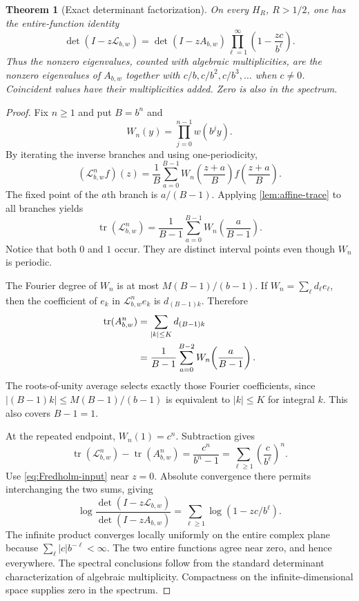 \documentclass[11pt,a4paper]{article}
\newtheorem{theorem}{Theorem}[section]
\theoremstyle{definition}
\theoremstyle{remark}
\newcommand{\Lop}{\mathcal L}
\newcommand{\tr}{\operatorname{tr}}
\numberwithin{equation}{section}
\begin{document}
\begin{theorem}[Exact determinant factorization]
\label{thm:general-det}
On every $H_R$, $R>1/2$, one has the entire-function identity
\begin{equation}
 \boxed{\displaystyle
 \det(I-z\Lop_{b,w})=
 \det(I-zA_{b,w})
 \prod_{\ell=1}^{\infty}\left(1-\frac{zc}{b^\ell}\right).}
 \label{eq:general-det}
\end{equation}
Thus the nonzero eigenvalues, counted with algebraic multiplicities, are the
nonzero eigenvalues of $A_{b,w}$ together with
$c/b,c/b^2,c/b^3,\ldots$ when $c\ne0$. Coincident values have their
multiplicities added. Zero is also in the spectrum.
\end{theorem}
\begin{proof}
Fix $n\ge1$ and put $B=b^n$ and
\begin{equation}
 W_n(y)=\prod_{j=0}^{n-1}w(b^jy).
 \label{eq:Wn}
\end{equation}
By iterating the inverse branches and using one-periodicity,
\begin{equation}
 (\Lop_{b,w}^nf)(z)=\frac1B\sum_{a=0}^{B-1}
       W_n\!\left(\frac{z+a}{B}\right)
       f\!\left(\frac{z+a}{B}\right).
 \label{eq:iterate}
\end{equation}
The fixed point of the $a$th branch is $a/(B-1)$. Applying
\cref{lem:affine-trace} to all branches yields
\begin{equation}
 \tr(\Lop_{b,w}^n)=\frac{1}{B-1}
    \sum_{a=0}^{B-1}W_n\!\left(\frac{a}{B-1}\right).
 \label{eq:fulltrace}
\end{equation}
Notice that both $0$ and $1$ occur. They are distinct interval points even
though $W_n$ is periodic.

The Fourier degree of $W_n$ is at most
$M(B-1)/(b-1)$. If $W_n=\sum_\ell d_\ell e_\ell$, then the coefficient of
$e_k$ in $\Lop_{b,w}^ne_k$ is $d_{(B-1)k}$. Therefore
\begin{align}
 \tr(A_{b,w}^n)
 &=\sum_{|k|\le K}d_{(B-1)k}\notag\\
 &=\frac{1}{B-1}\sum_{a=0}^{B-2}
      W_n\!\left(\frac{a}{B-1}\right).
 \label{eq:bandtrace}
\end{align}
The roots-of-unity average selects exactly those Fourier coefficients, since
$|(B-1)k|\le M(B-1)/(b-1)$ is equivalent to $|k|\le K$ for integral $k$.
This also covers $B-1=1$.

At the repeated endpoint, $W_n(1)=c^n$. Subtraction gives
\begin{equation}
 \tr(\Lop_{b,w}^n)-\tr(A_{b,w}^n)
 =\frac{c^n}{b^n-1}
 =\sum_{\ell\ge1}\left(\frac{c}{b^\ell}\right)^n.
 \label{eq:trace-difference}
\end{equation}
Use \cref{eq:Fredholm-input} near $z=0$. Absolute convergence there permits
interchanging the two sums, giving
\[
 \log\frac{\det(I-z\Lop_{b,w})}{\det(I-zA_{b,w})}
 =\sum_{\ell\ge1}\log(1-zc/b^\ell).
\]
The infinite product converges locally uniformly on the entire complex plane
because $\sum_\ell |c|b^{-\ell}<\infty$. The two entire functions agree
near zero, and hence everywhere. The spectral conclusions follow from the
standard determinant characterization of algebraic multiplicity. Compactness
on the infinite-dimensional space supplies zero in the spectrum.
\end{proof}
\end{document}

